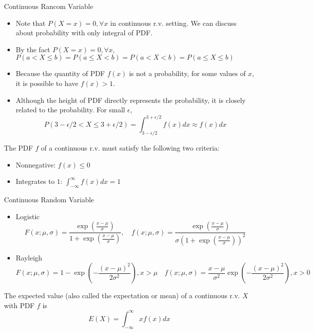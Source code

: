 \documentclass[8pt]{beamer}
\newcommand{\myexp}[1]{\exp{\left(#1\right)}}
\begin{document}
\begin{frame}{Continuous Rancom Variable}
    \begin{itemize}
        \item Note that $P(X=x) = 0, \forall x $  in continuous r.v. setting. We can discuss about probability with only integral of PDF.
        \item By the fact $P(X=x)=0, \forall x$, $P(a<X\leq b) = P(a\leq X <b) = P(a< X <b) = P(a \leq X \leq b)$
        \item Because the quantity of PDF $f(x)$ is not a probability, for some values of $x$, it is possible to have $f(x) > 1$.
        \item  Although the height of PDF directly represents the probability, it is closely related to the probability. For small $\epsilon$, 
        \[
            P(3 - \epsilon /2 < X \leq 3 + \epsilon/2 ) = \int_{3- \epsilon/2}^{3 + \epsilon/2} f(x) dx \approx f(x) dx
        \]
    \end{itemize}

    \begin{theorem}
        The PDF $f$ of a continuous r.v. must satisfy the following two criteria:
        \begin{itemize}
            \item Nonnegative: $f(x)\leq 0$
            \item Integrates to $1$: $\int_{-\infty}^\infty f(x) dx = 1$
        \end{itemize}
    \end{theorem}
\end{frame}

\begin{frame}{Continuous Random Variable}
    \begin{example}
        \begin{itemize}
            \item Logistic 
            \[
                F(x; \mu, \sigma) = \frac{\myexp{\frac{x-\mu}{\sigma }}}{1 + \myexp{\frac{x-\mu}{\sigma }}}, \quad f(x; \mu, \sigma) = \frac{\myexp{\frac{x-\mu}{\sigma }}}{\sigma \left(1 + \myexp{\frac{x-\mu}{\sigma }}\right)^2}
            \]
            \item Rayleigh 
            \[
                F(x; \mu, \sigma) = 1  - \myexp{- \frac{(x-\mu)^2}{2 \sigma^2}}, x > \mu \quad f(x; \mu, \sigma) = \frac{x-\mu}{\sigma^2} \myexp{-\frac{(x-\mu)^2}{2 \sigma^2}}, x > 0
            \]
        \end{itemize}
    \end{example}

   

    \begin{definition}
        The expected value (also called the expectation or mean) of a continuous r.v. $X$ with PDF $f$ is 
        \[
        E(X) = \int_{-\infty}^\infty x f(x) dx
        \]
    
    \end{definition}
\end{frame}
\end{document}
